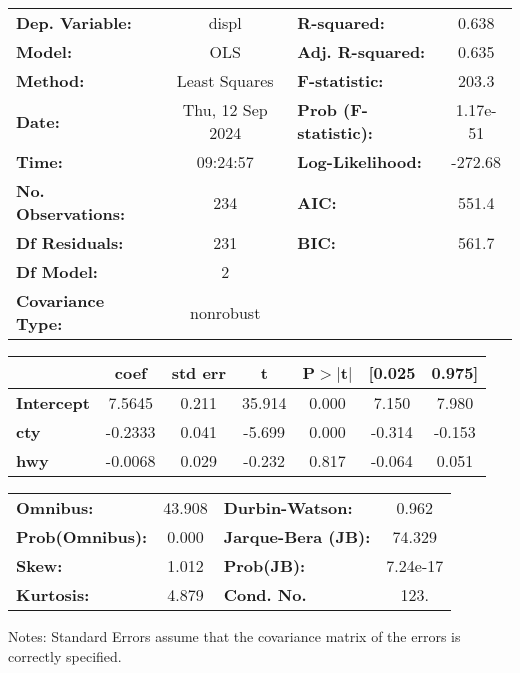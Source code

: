 \begin{center}
\begin{tabular}{lclc}
\toprule
\textbf{Dep. Variable:}    &      displ       & \textbf{  R-squared:         } &     0.638   \\
\textbf{Model:}            &       OLS        & \textbf{  Adj. R-squared:    } &     0.635   \\
\textbf{Method:}           &  Least Squares   & \textbf{  F-statistic:       } &     203.3   \\
\textbf{Date:}             & Thu, 12 Sep 2024 & \textbf{  Prob (F-statistic):} &  1.17e-51   \\
\textbf{Time:}             &     09:24:57     & \textbf{  Log-Likelihood:    } &   -272.68   \\
\textbf{No. Observations:} &         234      & \textbf{  AIC:               } &     551.4   \\
\textbf{Df Residuals:}     &         231      & \textbf{  BIC:               } &     561.7   \\
\textbf{Df Model:}         &           2      & \textbf{                     } &             \\
\textbf{Covariance Type:}  &    nonrobust     & \textbf{                     } &             \\
\bottomrule
\end{tabular}
\begin{tabular}{lcccccc}
                   & \textbf{coef} & \textbf{std err} & \textbf{t} & \textbf{P$> |$t$|$} & \textbf{[0.025} & \textbf{0.975]}  \\
\midrule
\textbf{Intercept} &       7.5645  &        0.211     &    35.914  &         0.000        &        7.150    &        7.980     \\
\textbf{cty}       &      -0.2333  &        0.041     &    -5.699  &         0.000        &       -0.314    &       -0.153     \\
\textbf{hwy}       &      -0.0068  &        0.029     &    -0.232  &         0.817        &       -0.064    &        0.051     \\
\bottomrule
\end{tabular}
\begin{tabular}{lclc}
\textbf{Omnibus:}       & 43.908 & \textbf{  Durbin-Watson:     } &    0.962  \\
\textbf{Prob(Omnibus):} &  0.000 & \textbf{  Jarque-Bera (JB):  } &   74.329  \\
\textbf{Skew:}          &  1.012 & \textbf{  Prob(JB):          } & 7.24e-17  \\
\textbf{Kurtosis:}      &  4.879 & \textbf{  Cond. No.          } &     123.  \\
\bottomrule
\end{tabular}
\end{center}

Notes: \newline
 [1] Standard Errors assume that the covariance matrix of the errors is correctly specified.